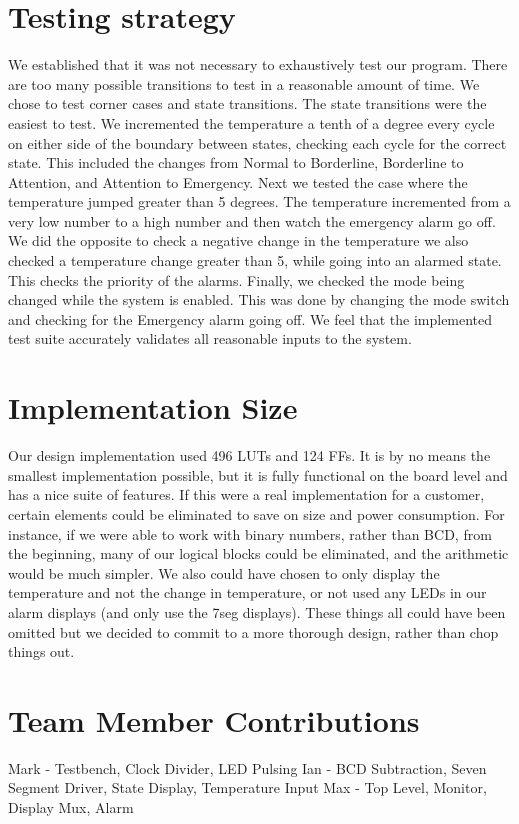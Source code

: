 \documentclass[12pt]{article}
\begin{document}
\section*{Testing strategy}
We established that it was not necessary to exhaustively test our program. There are too many possible transitions to test in a reasonable amount of time. We chose to test corner cases and state transitions. The state transitions were the easiest to test. We incremented the temperature a tenth of a degree every cycle on either side of the boundary between states, checking each cycle for the correct state. This included the changes from Normal to Borderline, Borderline to Attention, and Attention to Emergency. Next we tested the case where the temperature jumped greater than 5 degrees. The temperature incremented from a very low number to a high number and then watch the emergency alarm go off. We did the opposite to check a negative change in the temperature we also checked a temperature change greater than 5, while going into an alarmed state. This checks the priority of the alarms. Finally, we checked the mode being changed while the system is enabled. This was done by changing the mode switch and checking for the Emergency alarm going off. We feel that the implemented test suite accurately validates all reasonable inputs to the system.


\section*{Implementation Size}
Our design implementation used 496 LUTs and 124 FFs. It is by no means the smallest implementation possible, but it is fully functional on the board level and has a nice suite of features. If this were a real implementation for a customer, certain elements could be eliminated to save on size and power consumption. For instance, if we were able to work with binary numbers, rather than BCD, from the beginning, many of our logical blocks could be eliminated, and the arithmetic would be much simpler. We also could have chosen to only display the temperature and not the change in temperature, or not used any LEDs in our alarm displays (and only use the 7seg displays). These things all could have been omitted but we decided to commit to a more thorough design, rather than chop things out.


\section*{Team Member Contributions}
Mark - Testbench, Clock Divider, LED Pulsing
Ian - BCD Subtraction, Seven Segment Driver, State Display, Temperature Input
Max - Top Level, Monitor, Display Mux, Alarm
\end{document}
